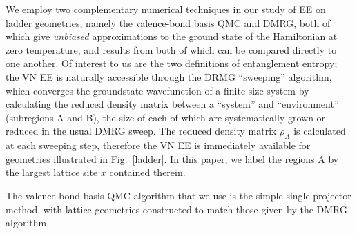 \documentclass[prl,aps,twocolumn,floatfix,amsmath,amssymb,superscriptaddress,tightenlines]{revtex4}
\begin{document}
We employ two complementary numerical techniques in our study of EE on ladder geometries, namely the valence-bond basis QMC and DMRG, both of which give {\it unbiased} approximations to the ground state of the Hamiltonian at zero temperature, and results from both of which can be compared directly to one another.  Of interest to us are the two definitions of entanglement entropy; the VN EE is naturally accessible through the DRMG ``sweeping'' algorithm, which converges the groundstate wavefunction of a finite-size system by calculating the reduced density matrix between a ``system'' and ``environment'' (subregions A and B), the size of each of which are systematically grown or reduced in the usual DMRG sweep.  The reduced density matrix $\rho_A$ is calculated at each sweeping step, therefore the VN EE is immediately available for geometries illustrated in Fig.~\ref{ladder}.  In this paper, we label the regions A by the largest lattice site $x$ contained therein.

The valence-bond basis QMC algorithm that we use is the simple single-projector method, with lattice geometries constructed to match those given by the DMRG algorithm.  





\end{document}

